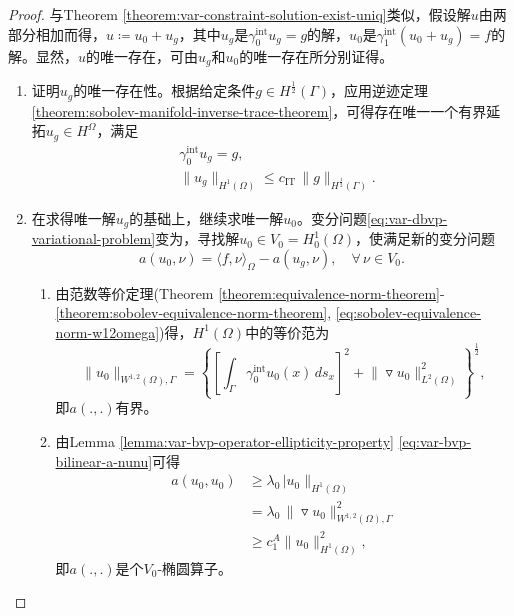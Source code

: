 \begin{proof}
  与Theorem \ref{theorem:var-constraint-solution-exist-uniq}类似，假设解$u$由两部分相加而得，$u \coloneqq u_0 + u_g$，其中$u_g$是$\gamma_0^{\text{int}} u_g = g$的解，$u_0$是$\gamma_1^{\text{int}} (u_0 + u_g) = f$的解。显然，$u$的唯一存在，可由$u_g$和$u_0$的唯一存在所分别证得。
\begin{enumerate}
  \item 证明$u_g$的唯一存在性。根据给定条件$g \in H^{\frac{1}{2}}(\Gamma)$，应用逆迹定理\eqref{theorem:sobolev-manifold-inverse-trace-theorem}，可得存在唯一一个有界延拓$u_g \in H^{\Omega}$，满足
  \begin{equation*}
    \begin{split}
      & \gamma_{0}^{\text{int}} u_g = g, \\
      & \big\| u_g \big\|_{H^{1}(\Omega)} \le c_{\text{IT}} \, \big\| g \big\|_{H^{\frac{1}{2}}(\Gamma)}.
    \end{split}
  \end{equation*}

  \item 在求得唯一解$u_g$的基础上，继续求唯一解$u_0$。变分问题\eqref{eq:var-dbvp-variational-problem}变为，寻找解$u_0 \in V_0 = H_{0}^{1}(\Omega)$，使满足新的变分问题
  \begin{equation}
    \label{eq:var-dbvp-variational-problem-u0}
    a(u_0, \nu) = \langle f, \nu \rangle_{\Omega} - a (u_g, \nu), \quad \forall \, \nu \in V_0.
  \end{equation}
  \begin{enumerate}
    \item 由范数等价定理(Theorem \ref{theorem:equivalence-norm-theorem}-\ref{theorem:sobolev-equivalence-norm-theorem}, \eqref{eq:sobolev-equivalence-norm-w12omega})得，$H^{1}(\Omega)$中的等价范为
    \begin{equation*}
        \big\| u_0 \big\|_{W^{1,2}(\Omega), \Gamma} = \left\{
      \left[
      \int_{\Gamma} \gamma_{0}^{\text{int}} u_0(x) \, ds_x
      \right]^2
      + \big\| \triangledown u_0 \big\|^2_{L^2(\Omega)}
       \right\}^{\frac{1}{2}},
    \end{equation*}
    即$a(.,.)$有界。

    \item 由Lemma \ref{lemma:var-bvp-operator-ellipticity-property} \eqref{eq:var-bvp-bilinear-a-nunu}可得
    \begin{equation}
      \label{eq:var-bvp-operator-a-ellipticity}
      \begin{split}
        a(u_0,u_0) &\ge \lambda_0 \, \big| u_0 \big\|_{H^{1}(\Omega)} \\
        &= \lambda_0 \, \big\| \triangledown u_0 \big\|_{W^{1,2}(\Omega), \Gamma}^2 \\
        &\ge c_1^A \big\| u_0 \big\|_{H^1(\Omega)}^2,
      \end{split}
    \end{equation}
    即$a(.,.)$是个$V_0$-椭圆算子。


\end{enumerate}
\end{enumerate}
\end{proof}
